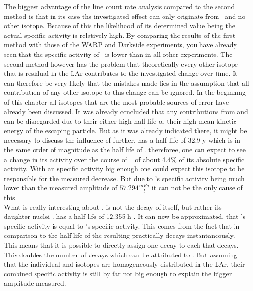 \documentclass[encoding=utf8,british]{tumphthesis}
\begin{document}
The biggest advantage of the line count rate analysis compared to the second method is that in its case the investigated effect can only originate from \Kr\ and no other isotope.
Because of this the likelihood of its determined value being the actual specific activity is relatively high.
By comparing the results of the first method with those of the WARP and Darkside experiments, you have already seen that the specific activity of \Kr\ is lower than in all other experiments.
The second method however has the problem that theoretically every other isotope that is residual in the LAr contributes to the investigated change over time.
It can therefore be very likely that the mistakes made lies in the assumption that all contribution of any other isotope to this change can be ignored. 
In the beginning of this chapter all isotopes that are the most probable sources of error have already been discussed.
It was already concluded that any contributions from  and  can be disregarded due to their either high half life or their high mean kinetic energy of the escaping particle.
But as it was already indicated there, it might be necessary to discuss the influence of  further.
 has a half life of 32.9 y which is in the same order of magnitude as the half life of \Kr.
thereforee, one can expect to see a change in its activity over the course of \PII~ of about 4.4$\%$ of its absolute specific activity.
With an specific activity big enough one could expect this isotope to be responsible for the measured decrease.
But due to 's specific activity being much lower than the measured amplitude of $57.294 \frac{\unit{mBq}}{\unit{l}}$  it can not be the only cause of this .
\\

What is really interesting about , is not the decay of  itself, but rather its daughter nuclei .
 has a half life of 12.355 h \cite{chen_nuclear_2016}.
It can now be approximated, that 's specific activity is equal to 's specific activity.
This comes from the fact that in comparison to the half life of  the resulting  practically decays instantaneously.
This means that it is possible to directly assign one  decay to each  that decays.
This doubles the number of decays which can be attributed to .
But assuming that the individual  and  isotopes are homogeneously distributed in the LAr, their combined specific activity is still by far not big enough to explain the bigger amplitude measured.
\\
\end{document}
